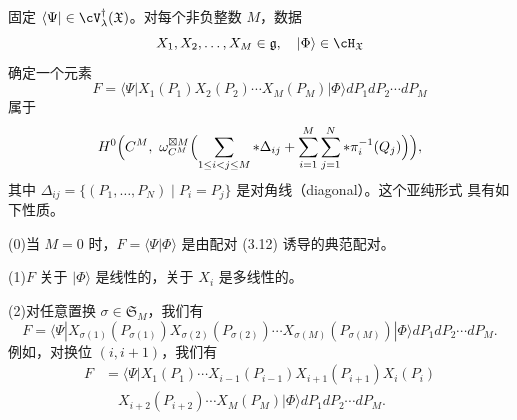 \begin{theorem}[3.24]
固定 $\langle\Psi|\in\cV_\lambda^\dagger(\mathfrak{X})$。对每个非负整数 $M$，数据
\[
  X_1,X_2,\dots,X_M\in\mathfrak{g},\quad |\Phi\rangle\in\cH_{\mathfrak{X}}
\]
确定一个元素
\[
  F = \langle\Psi|X_1(P_1)X_2(P_2)\cdots X_M(P_M)|\Phi\rangle
      dP_1dP_2\cdots dP_M
\]
属于
\[
  H^0\Bigl(C^M,\ \omega_{C^M}^{\boxtimes M}\Bigl(
    \sum_{1\le i<j\le M}*\Delta_{ij}
    +\sum_{i=1}^{M}\sum_{j=1}^{N}*\pi_i^{-1}(Q_j)\Bigr)\Bigr),
\]
其中 $\Delta_{ij}=\{(P_1,\dots,P_N)\mid P_i=P_j\}$ 是对角线（diagonal）。这个亚纯形式
具有如下性质。

(0)\quad 当 $M=0$ 时，$F=\langle\Psi|\Phi\rangle$ 是由配对 (3.12) 诱导的典范配对。

(1)\quad $F$ 关于 $|\Phi\rangle$ 是线性的，关于 $X_i$ 是多线性的。

(2)\quad 对任意置换 $\sigma\in\mathfrak{S}_M$，我们有
\[
  F = \langle\Psi|X_{\sigma(1)}(P_{\sigma(1)})X_{\sigma(2)}(P_{\sigma(2)})
      \cdots X_{\sigma(M)}(P_{\sigma(M)})|\Phi\rangle dP_1dP_2\cdots dP_M .
\]
例如，对换位 $(i,i+1)$，我们有
\[
  \begin{aligned}
  F &= \langle\Psi|X_1(P_1)\cdots X_{i-1}(P_{i-1})X_{i+1}(P_{i+1})X_i(P_i)\\
    &\quad X_{i+2}(P_{i+2})\cdots X_M(P_M)|\Phi\rangle dP_1dP_2\cdots dP_M .
  \end{aligned}
\]


\end{theorem}
